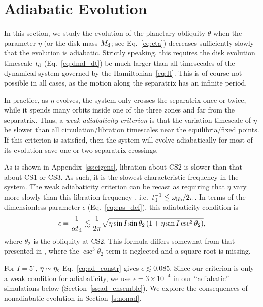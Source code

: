 \documentclass[
        fleqn,
        usenatbib,
        referee,
    ]{mnras}
\newcommand*{\p}[1]{\left(#1\right)}
\begin{document}
\section{Adiabatic Evolution}\label{s:ad}

In this section, we study the evolution of the planetary obliquity $\theta$ when
the parameter $\eta$ (or the disk mass $M_{\rm d}$; see Eq.~\eqref{eq:eta})
decreases sufficiently slowly that the evolution is adiabatic. Strictly
speaking, this requires the disk evolution timescale $t_{\rm d}$
(Eq.~\eqref{eq:dmd_dt}) be much larger than all timesccales of the dynamical
system governed by the Hamiltonian~\eqref{eq:H}. This is of course not possible
in all cases, as the motion along the separatrix has an infinite period.

In practice, as $\eta$ evolves, the system only crosses the separatrix once or
twice, while it spends many orbits inside one of the three zones and far from
the separatrix. Thus, a \emph{weak adiabaticity criterion} is that the variation
timescale of $\eta$ be slower than all circulation/libration timescales near the
equilibria/fixed points. If this criterion is satisfied, then the system will
evolve adiabatically for most of its evolution save one or two separatrix
crossings.

As is shown in Appendix~\ref{ss:eigens}, libration about CS2 is slower than that
about CS1 or CS3. As such, it is the slowest characteristic frequency in the
system. The weak adiabaticity criterion can be recast as requiring that $\eta$
vary more slowly than this libration frequency
\citep[see][]{ward2004II,millholland_disk}, i.e.\ $t_{\rm d}^{-1} \lesssim
\omega_{\rm lib} / 2\pi$. In terms of the dimensionless parameter $\epsilon$
(Eq.~\eqref{eq:eps_def}), this adiabaticity condition is
\begin{equation}
    \epsilon = \frac{1}{\alpha t_{\rm d}}
        \lesssim \frac{1}{2\pi}\sqrt{\eta\sin I \sin \theta_2
            \p{1 + \eta \sin I \csc^3 \theta_2}},
            \label{eq:ad_constr}
\end{equation}
where $\theta_2$ is the obliquity at CS2. This formula differs somewhat from
that presented in \citet{millholland_disk}, where the $\csc^3\theta_2$ term is
neglected and a square root is missing.

For $I = 5^\circ$, $\eta \sim \eta_{\rm c}$ Eq.~\eqref{eq:ad_constr} gives $\epsilon
\lesssim 0.085$. Since our criterion is only a weak condition for adiabaticity,
we use $\epsilon = 3 \times 10^{-4}$ in our ``adiabatic'' simulations below
(Section~\autoref{ss:ad_ensemble}). We explore the consequences of nonadiabatic
evolution in Section~\ref{s:nonad}.
\end{document}
